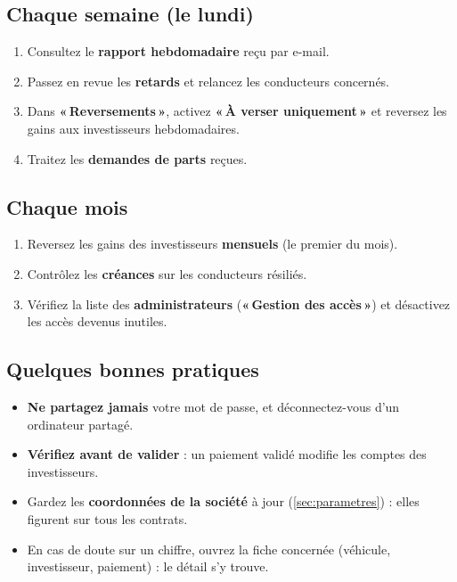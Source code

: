 \documentclass[11pt,a4paper]{article}
\newcommand{\Needspace}[1]{\par\ifdim\pagegoal<\maxdimen\ifdim\dimexpr\pagegoal-\pagetotal\relax<#1\relax\newpage\fi\fi}
\newcommand{\bouton}[1]{\textbf{«\,#1\,»}}
\let\oldsubsection\subsection
\renewcommand{\subsection}{\Needspace{10.5cm}\oldsubsection}
\begin{document}
\subsection{Chaque semaine (le lundi)}
\begin{enumerate}
  \item Consultez le \textbf{rapport hebdomadaire} reçu par e-mail.
  \item Passez en revue les \textbf{retards} et relancez les conducteurs concernés.
  \item Dans \bouton{Reversements}, activez \bouton{À verser uniquement} et reversez les gains aux investisseurs hebdomadaires.
  \item Traitez les \textbf{demandes de parts} reçues.
\end{enumerate}

\subsection{Chaque mois}
\begin{enumerate}
  \item Reversez les gains des investisseurs \textbf{mensuels} (le premier du mois).
  \item Contrôlez les \textbf{créances} sur les conducteurs résiliés.
  \item Vérifiez la liste des \textbf{administrateurs} (\bouton{Gestion des accès}) et désactivez les accès devenus inutiles.
\end{enumerate}

\subsection{Quelques bonnes pratiques}
\begin{itemize}
  \item \textbf{Ne partagez jamais} votre mot de passe, et déconnectez-vous d'un ordinateur partagé.
  \item \textbf{Vérifiez avant de valider} : un paiement validé modifie les comptes des investisseurs.
  \item Gardez les \textbf{coordonnées de la société} à jour (\autoref{sec:parametres}) : elles figurent sur tous les contrats.
  \item En cas de doute sur un chiffre, ouvrez la fiche concernée (véhicule, investisseur, paiement) : le détail s'y trouve.
\end{itemize}

\end{document}
